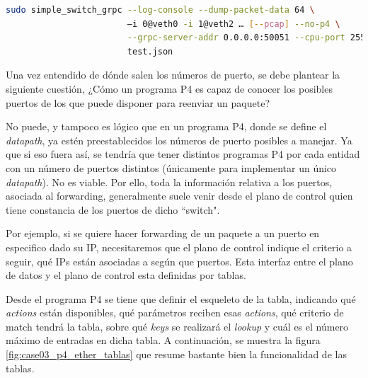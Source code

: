 \begin{lstlisting}[language= bash, style=Consola, caption={Ejecución de instancia del BMv2 - Case04},label=code:case04_p4_ether_instacia]
    sudo simple_switch_grpc --log-console --dump-packet-data 64 \
                        –i 0@veth0 -i 1@veth2 … [--pcap] --no-p4 \
                        --grpc-server-addr 0.0.0.0:50051 --cpu-port 255 \
                        test.json
\end{lstlisting}
\vspace{0.5cm}
Una vez entendido de dónde salen los números de puerto, se debe plantear la siguiente cuestión, ¿Cómo un programa P4 es capaz de conocer los posibles puertos de los que puede disponer para reenviar un paquete?\\
\par
No puede, y tampoco es lógico que en un programa P4, donde se define el \textit{datapath}, ya estén preestablecidos los números de puerto posibles a manejar. Ya que si eso fuera así, se tendría que tener distintos programas P4 por cada entidad con un número de puertos distintos (únicamente para implementar un único \textit{datapath}). No es viable. Por ello, toda la información relativa a los puertos, asociada al forwarding, generalmente suele venir desde el plano de control quien tiene constancia de los puertos de dicho ``switch".\\
\par

Por ejemplo, si se quiere hacer forwarding de un paquete a un puerto en especifico dado su IP, necesitaremos que el plano de control indique el criterio a seguir, qué IPs están asociadas a según que puertos. Esta interfaz entre el plano de datos y el plano de control esta definidas por tablas.\\
\par

Desde el programa P4 se tiene que definir el esqueleto de la tabla, indicando qué \textit{actions}
están disponibles, qué parámetros reciben esas \textit{actions}, qué criterio de match tendrá la tabla, sobre qué \textit{keys} se realizará el \textit{lookup} y cuál es el número máximo de entradas en dicha tabla. A continuación, se muestra la figura \ref{fig:case03_p4_ether_tablas} que resume bastante bien la funcionalidad de las tablas.\\
\par

